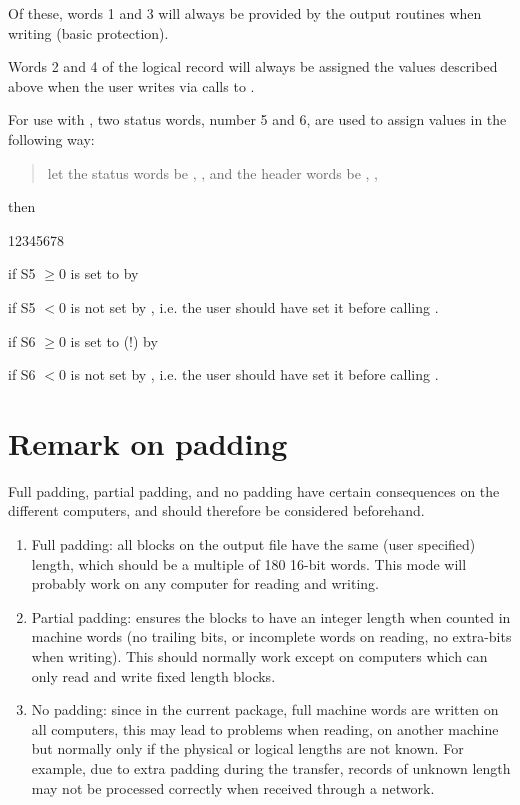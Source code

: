 Of these, words 1 and 3 will always be  provided by the output
routines when writing (basic protection).
 
Words 2 and 4 of the logical record will always be assigned the values
described above when the user writes via calls to .
 
For use with , two status words, number 5 and 6, are used to
assign values in the following way:

\begin{quote}
let the status words be , , 
and the header words be , ,
\end{quote}

then

\begin{DLtt}{12345678}
\item[if S5 $\geq0$]  is set to  by 
\item[if S5 $< 0$]    is not set by ,
                     i.e. the user should have set it before
                     calling .
\item[if S6 $\geq0$]  is set to  (!) by 
\item[if S6 $< 0$]    is not set by ,
                     i.e. the user should have set it before
                     calling .
\end{DLtt}

\section{Remark on padding}

Full padding, partial padding, and no padding have certain
consequences on the different computers, and should therefore be
considered beforehand.
\begin{enumerate}
\item Full padding: all blocks on the output file have the same (user
      specified) length, which should be a multiple of 180 16-bit words.
      This mode will probably work on any computer for
      reading and writing.
\item Partial padding: ensures the blocks to have an integer length when
      counted in machine words (no trailing bits, or incomplete words on
      reading, no extra-bits when writing). This should normally work
      except on computers which can only read and write fixed length blocks.
\item No padding: since in the current package, full machine words are
      written on all computers, this may lead to problems when reading, on
      another machine but normally only if the physical or logical lengths
      are not known. For example, due to extra padding during the transfer,
      records of unknown length may not be processed correctly
      when received through a network.
\end{enumerate}

